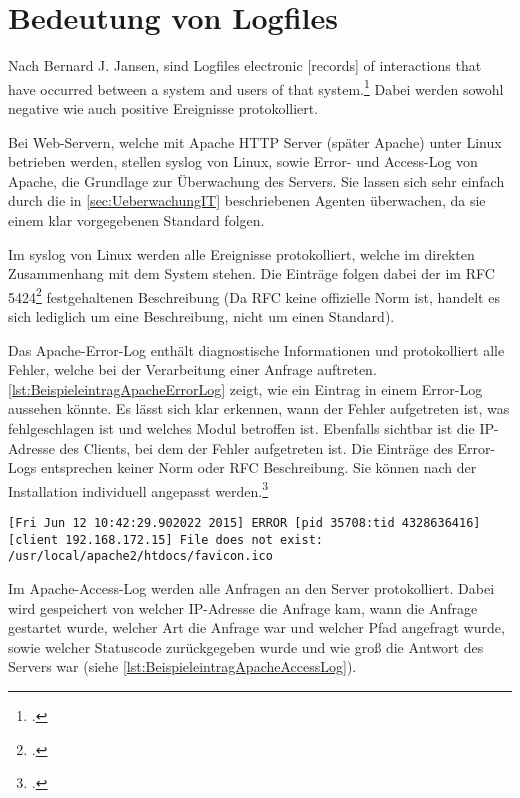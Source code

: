 \section{Bedeutung von Logfiles}\label{sec:BedeutungVonLogfiles}
Nach Bernard J. Jansen, sind Logfiles \flqq electronic [records] of interactions that have occurred between a system and users of that system\frqq.\footcite[S. 2]{Jansen.2008} Dabei werden sowohl negative wie auch positive Ereignisse protokolliert.

Bei Web-Servern, welche mit Apache \acs{HTTP} Server (später Apache) unter Linux betrieben werden, stellen syslog von Linux, sowie Error- und Access-Log von Apache, die Grundlage zur Überwachung des Servers. Sie lassen sich sehr einfach durch die in \autoref{sec:UeberwachungIT} beschriebenen Agenten überwachen, da sie einem klar vorgegebenen Standard folgen.

Im syslog von Linux werden alle Ereignisse protokolliert, welche im direkten Zusammenhang mit dem System stehen. Die Einträge folgen dabei der im \ac{RFC} 5424\footcite[RFC 5424,][]{RFC5424.2009} festgehaltenen Beschreibung (Da  RFC keine offizielle Norm ist, handelt es sich lediglich um eine Beschreibung, nicht um einen Standard).

Das Apache-Error-Log enthält diagnostische Informationen und protokolliert alle Fehler, welche bei der Verarbeitung einer Anfrage auftreten. \autoref{lst:BeispieleintragApacheErrorLog} zeigt, wie ein Eintrag in einem Error-Log aussehen könnte. Es lässt sich klar erkennen, wann der Fehler aufgetreten ist, was fehlgeschlagen ist und welches Modul betroffen ist. Ebenfalls sichtbar ist die \ac{IP}-Adresse des Clients, bei dem der Fehler aufgetreten ist. Die Einträge des Error-Logs entsprechen keiner Norm oder \ac{RFC} Beschreibung. Sie können nach der Installation individuell angepasst werden.\footcite[Vgl.][]{ApacheErrorLog.2015} \\

\begin{lstlisting}[caption=Beispieleintrag für ein Apache-Error-Log,label=lst:BeispieleintragApacheErrorLog]
[Fri Jun 12 10:42:29.902022 2015] ERROR [pid 35708:tid 4328636416] [client 192.168.172.15] File does not exist: /usr/local/apache2/htdocs/favicon.ico
\end{lstlisting}

Im Apache-Access-Log werden alle Anfragen an den Server protokolliert. Dabei wird gespeichert von welcher \ac{IP}-Adresse die Anfrage kam, wann die Anfrage gestartet wurde, welcher Art die Anfrage war und welcher Pfad angefragt wurde, sowie welcher Statuscode zurückgegeben wurde und wie groß die Antwort des Servers war (siehe \autoref{lst:BeispieleintragApacheAccessLog}). \\

